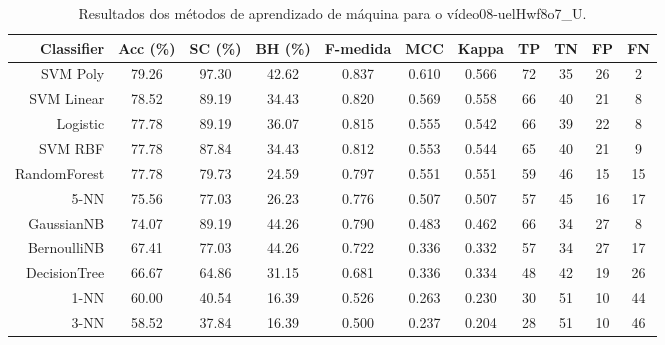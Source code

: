 \begin{table}[!htb]
\centering
\caption{Resultados dos métodos de aprendizado de máquina para o vídeo08-uelHwf8o7_U.}
\label{tab:08-uelHwf8o7_U}
\begin{tabular}{r|c|c|c|c|c|c|c|c|c|c}
\hline\hline
Classifier & Acc (\%) & SC (\%) & BH (\%) & F-medida & MCC & Kappa & TP & TN & FP & FN \\ \hline
SVM Poly & 79.26 & 97.30 & 42.62 & 0.837 & 0.610 & 0.566 & 72 & 35 & 26 & 2 \\ 
SVM Linear & 78.52 & 89.19 & 34.43 & 0.820 & 0.569 & 0.558 & 66 & 40 & 21 & 8 \\ 
Logistic & 77.78 & 89.19 & 36.07 & 0.815 & 0.555 & 0.542 & 66 & 39 & 22 & 8 \\ 
SVM RBF & 77.78 & 87.84 & 34.43 & 0.812 & 0.553 & 0.544 & 65 & 40 & 21 & 9 \\ 
RandomForest & 77.78 & 79.73 & 24.59 & 0.797 & 0.551 & 0.551 & 59 & 46 & 15 & 15 \\ 
5-NN & 75.56 & 77.03 & 26.23 & 0.776 & 0.507 & 0.507 & 57 & 45 & 16 & 17 \\ 
GaussianNB & 74.07 & 89.19 & 44.26 & 0.790 & 0.483 & 0.462 & 66 & 34 & 27 & 8 \\ 
BernoulliNB & 67.41 & 77.03 & 44.26 & 0.722 & 0.336 & 0.332 & 57 & 34 & 27 & 17 \\ 
DecisionTree & 66.67 & 64.86 & 31.15 & 0.681 & 0.336 & 0.334 & 48 & 42 & 19 & 26 \\ 
1-NN & 60.00 & 40.54 & 16.39 & 0.526 & 0.263 & 0.230 & 30 & 51 & 10 & 44 \\ 
3-NN & 58.52 & 37.84 & 16.39 & 0.500 & 0.237 & 0.204 & 28 & 51 & 10 & 46 \\ 
\hline\hline
\end{tabular}
\end{table}
